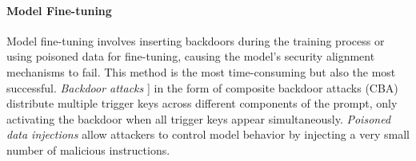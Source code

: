 \paragraph{Model Fine-tuning} Model fine-tuning involves inserting backdoors during the training process or using poisoned data for fine-tuning, causing the model’s security alignment mechanisms to fail. This method is the most time-consuming but also the most successful. \textit{Backdoor attacks} ] \cite{backdoor_huang-etal-2024-composite} in the form of composite backdoor attacks (CBA) distribute multiple trigger keys across different components of the prompt, only activating the backdoor when all trigger keys appear simultaneously. \textit{Poisoned data injections} \cite{poison_xu-etal-2024-instructions} allow attackers to control model behavior by injecting a very small number of malicious instructions. 

